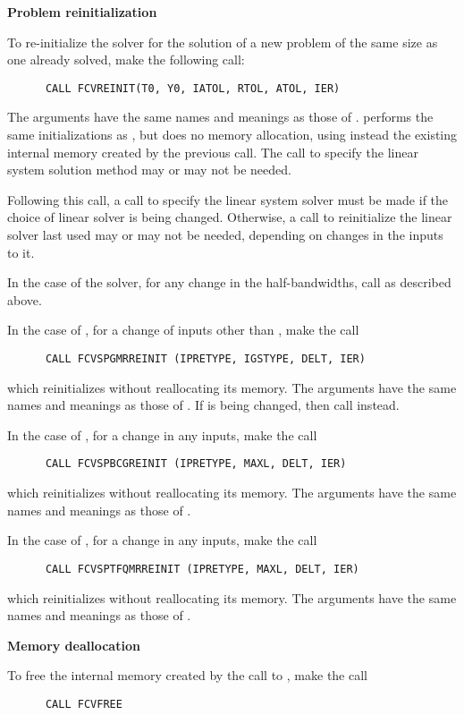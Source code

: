 \begin{Steps}
\item {\bf Problem reinitialization}

  To re-initialize the {\cvode} solver for the solution of a new problem
  of the same size as one already solved, make the following call:
\begin{verbatim}
      CALL FCVREINIT(T0, Y0, IATOL, RTOL, ATOL, IER)
\end{verbatim}
  The arguments have the same names and meanings as those of .
   performs the same initializations as
  , but does no memory allocation, using instead the existing
  internal memory created by the previous  call.  The call to
  specify the linear system solution method may or may not be needed.

  Following this call, a call to specify the linear system solver must be
  made if the choice of linear solver is being changed.  Otherwise, a call
  to reinitialize the linear solver last used may or may not be needed,
  depending on changes in the inputs to it.

  In the case of the {\band} solver, for any change in the half-bandwidths,
  call  as described above.

  In the case of {\spgmr}, for a change of inputs other than ,
  make the call
\begin{verbatim}
      CALL FCVSPGMRREINIT (IPRETYPE, IGSTYPE, DELT, IER)
\end{verbatim}
  which reinitializes {\spgmr} without reallocating its memory.
  The arguments have the same names and meanings as those of .
  If  is being changed, then call  instead.

  In the case of {\spbcg}, for a change in any inputs, make the call
\begin{verbatim}
      CALL FCVSPBCGREINIT (IPRETYPE, MAXL, DELT, IER)
\end{verbatim}
  which reinitializes {\spbcg} without reallocating its memory.
  The arguments have the same names and meanings as those of .

  In the case of {\sptfqmr}, for a change in any inputs, make the call
\begin{verbatim}
      CALL FCVSPTFQMRREINIT (IPRETYPE, MAXL, DELT, IER)
\end{verbatim}
  which reinitializes {\sptfqmr} without reallocating its memory.
  The arguments have the same names and meanings as those of .


\item {\bf Memory deallocation}

  To free the internal memory created by the call to ,
  make the call
\begin{verbatim}
      CALL FCVFREE
\end{verbatim}

\end{Steps}
